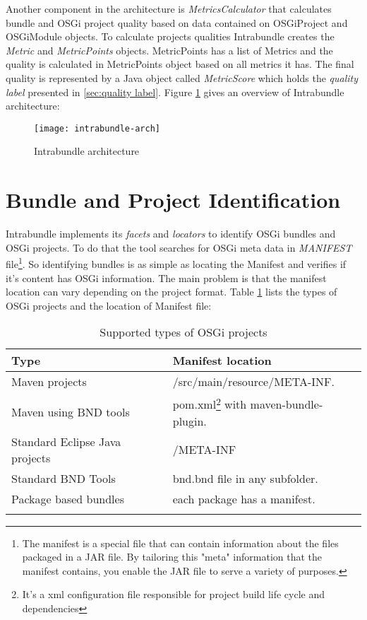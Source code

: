 Another component in the architecture is \emph{MetricsCalculator} that calculates bundle and OSGi project quality based on data contained on OSGiProject and OSGiModule objects. To calculate projects qualities Intrabundle creates the \emph{Metric} and \emph{MetricPoints} objects. MetricPoints has a list of Metrics and the quality is calculated in MetricPoints object based on all metrics it has. The final quality is represented by a Java object called \emph{MetricScore} which holds the \emph{quality label} presented in \ref{sec:quality label}.     
Figure \ref{intrabundle-arch} gives an overview of Intrabundle architecture:

\newpage

\begin{figure}[h]
\caption{Intrabundle architecture}
\label{intrabundle-arch}
\centering
\texttt{[image: intrabundle-arch]}
\end{figure}  
\FloatBarrier


\section{Bundle and Project Identification}

Intrabundle implements its \emph{facets} and \emph{locators} to identify OSGi bundles and OSGi projects. To do that the tool searches for OSGi meta data in \emph{MANIFEST} file\footnote{The manifest is a special file that can contain information about the files packaged in a JAR file. By tailoring this "meta" information that the manifest contains, you enable the JAR file to serve a variety of purposes.}. So identifying bundles is as simple as locating the Manifest and verifies if it's content has OSGi information. The main problem is that the manifest location can vary depending on the project format. Table \ref{osgi-project-type} lists the types of OSGi projects and the location of Manifest file:     

\begin{table}[h]
\caption{Supported types of OSGi projects}
\label{osgi-project-type}
\begin{center}
    \begin{tabular}{  p{4cm} | p{6cm} }
    \Xhline{2\arrayrulewidth}
    Type & Manifest location \\  \hline
    Maven projects & /src/main/resource/META-INF.\\ \hline
    Maven using BND tools & pom.xml\footnote{It's a xml configuration file responsible for project build life cycle and dependencies} with maven-bundle-plugin.\\ \hline
    Standard Eclipse Java projects & /META-INF\\ \hline
    Standard BND Tools & bnd.bnd file in any subfolder.\\ \hline
    Package based bundles & each package has a manifest.\\  
   \Xhline{2\arrayrulewidth}

    \end{tabular}
\end{center}
\end{table}
\FloatBarrier


